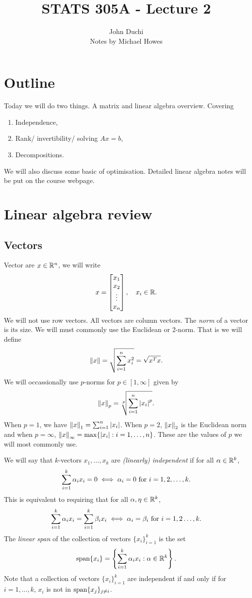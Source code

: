 


\title{STATS 305A - Lecture 2}
\author{John Duchi\\ Notes by Michael Howes}


\maketitle
\section{Outline}
Today we will do two things. A matrix and linear algebra overview. Covering
\begin{enumerate}
    \item Independence,
    \item Rank/ invertibility/ solving $Ax=b$,
    \item Decompositions.
\end{enumerate}
We will also discuss some basic of optimisation. Detailed linear algebra notes will be put on the course webpage.

\section{Linear algebra review}
\subsection{Vectors}
Vector are $x \in {\mathbb R}^n$, we will write
\[x = \begin{bmatrix}
    x_1\\
    x_2\\
    \vdots\\
    x_n
\end{bmatrix}, \quad x_i \in {\mathbb R}.\]
We will not use row vectors. All vectors are column vectors. The \emph{norm} of a vector is its size. We will must commonly use the Euclidean or 2-norm. That is we will define
\[\left\|x\right\| = \sqrt{\sum_{i=1}^n x_i^2}=\sqrt{x^Tx}. \]
We will occassionally use $p$-norms for $p \in [1,\infty]$ given by
\[\left\|x\right\|_p = \sqrt[p]{\sum_{i=1}^n {\left\lvert x_i\right\rvert}^p}. \]
When $p=1$, we have $\left\|x\right\|_1 = \sum_{i=1}^n {\left\lvert x_i\right\rvert}$. When $p=2$, $\left\|x\right\|_2$ is the Euclidean norm and when $p=\infty$, $\left\|x\right\|_\infty = \max\{{\left\lvert x_i\right\rvert}: i =1,\ldots, n\}$. These are the values of $p$ we will most commonly use.

We will say that $k$-vectors $x_1,\ldots, x_k$ are \emph{(linearly) independent} if for all ${\alpha} \in {\mathbb R}^k$,
\[\sum_{i=1}^k {\alpha}_ix_i = 0 \iff {\alpha}_i = 0 \text{ for } i=1,2,\ldots,k. \]
This is equivalent to requiring that for all ${\alpha}, \eta \in {\mathbb R}^k$,
\[\sum_{i=1}^k {\alpha}_ix_i = \sum_{i=1}^k \beta_ix_i \iff {\alpha}_i = \beta_i \text{ for } i = 1,2\ldots, k. \]
The \emph{linear span} of the collection of vectors $\{x_i\}_{i=1}^k$ is the set
\[\operatorname{span}\{x_i\} = \left\{\sum_{i=1}^k{\alpha}_ix_i : {\alpha} \in {\mathbb R}^k\right\}. \]
Note that a collection of vectors $\{x_i\}_{i=1}^k$ are independent if and only if for $i=1,\ldots,k$, $x_i$ is not in $\operatorname{span}\{x_j\}_{j\neq i}$.
